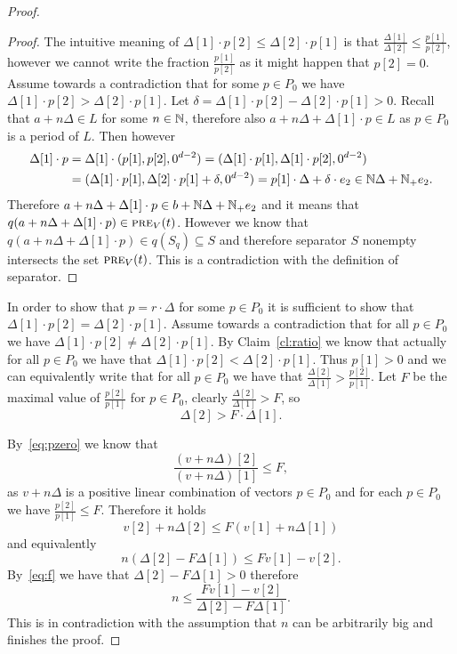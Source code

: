 \begin{proof}
\begin{proof}
The intuitive meaning of $\Delta[1] \cdot p[2] \leq \Delta[2] \cdot p[1]$ is that $\frac{\Delta[1]}{\Delta[2]} \leq \frac{p[1]}{p[2]}$,
however we cannot write the fraction $\frac{p[1]}{p[2]}$ as it might happen that $p[2] =  0$.
Assume towards a contradiction that for some $p \in P_0$ we have $\Delta[1] \cdot p[2] > \Delta[2] \cdot p[1]$.
Let $\delta = \Delta[1] \cdot p[2] - \Delta[2] \cdot p[1] > 0$. Recall that $a + n\Delta \in L$ for some $n \in \mathbb{N}$,
therefore also $a + n\Delta + \Delta[1] \cdot p \in L$ as $p \in P_0$ is a period of $L$.
Then however
\begin{align*}
\Delta[1] \cdot p & = \Delta[1]  \cdot (p[1], p[2], 0^{d-2}) = (\Delta[1] \cdot p[1], \Delta[1] \cdot p[2], 0^{d-2}) \\
& = (\Delta[1] \cdot p[1], \Delta[2] \cdot p[1] + \delta, 0^{d-2}) = p[1] \cdot \Delta + \delta \cdot e_2 \in \mathbb{N} \Delta + \mathbb{N}_{+} e_2.
\end{align*}
Therefore $a + n\Delta + \Delta[1] \cdot p \in b + \mathbb{N} \Delta + \mathbb{N}_{+} e_2$ and it means that $q(a + n\Delta + \Delta[1] \cdot p) \in \textsc{pre}_V(t)$.
However we know that $q(a + n\Delta + \Delta[1] \cdot p) \in q(S_q) \subseteq S$ and therefore separator $S$ nonempty intersects 
the set $\textsc{pre}_V(t)$. This is a contradiction with the definition of separator.
\end{proof}

In order to show that $p = r \cdot \Delta$ for some $p \in P_0$ it is sufficient to show that $\Delta[1] \cdot p[2] = \Delta[2] \cdot p[1]$.
Assume towards a contradiction that for all $p \in P_0$ we have $\Delta[1] \cdot p[2] \neq \Delta[2] \cdot p[1]$.
By Claim~\ref{cl:ratio} we know that actually for all $p \in P_0$ we have that $\Delta[1] \cdot p[2] < \Delta[2] \cdot p[1]$.
Thus $p[1] > 0$ and we can equivalently write that for all $p \in P_0$ we have that $\frac{\Delta[2]}{\Delta[1]} > \frac{p[2]}{p[1]}$.
Let $F$ be the maximal value of $\frac{p[2]}{p[1]}$ for $p \in P_0$, clearly $\frac{\Delta[2]}{\Delta[1]} > F$,
so
\begin{equation}\label{eq:f}
\Delta[2] > F \cdot \Delta[1].
\end{equation}

By~\eqref{eq:pzero} we know that
\[
\frac{(v+n\Delta)[2]}{(v+n\Delta)[1]} \leq F,
\]
as $v+n\Delta$ is a positive linear combination of vectors $p \in P_0$ and for each $p \in P_0$
we have $\frac{p[2]}{p[1]} \leq F$.
Therefore it holds
\[
v[2] + n\Delta[2] \leq F(v[1] + n\Delta[1])
\]
and equivalently
\[
n(\Delta[2] - F\Delta[1]) \leq Fv[1] - v[2].
\]
By~\eqref{eq:f} we have that $\Delta[2] - F\Delta[1] > 0$ therefore
\[
n \leq \frac{Fv[1] - v[2]}{\Delta[2] - F\Delta[1]}.
\]
This is in contradiction with the assumption that $n$ can be arbitrarily big
and finishes the proof.
\end{proof}

